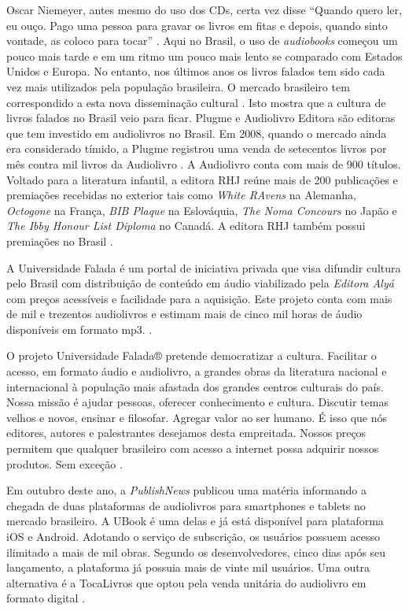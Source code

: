 Oscar Niemeyer, antes mesmo do uso dos CDs, certa vez disse ``Quando quero ler, eu ouço. Pago uma pessoa para gravar os livros em fitas e depois, quando sinto vontade, as coloco para tocar'' \cite{audiobookinovacao}. Aqui no Brasil, o uso de \textit{audiobooks} começou um pouco mais tarde e em um ritmo um pouco mais lento se comparado com Estados Unidos e Europa. No entanto, nos últimos anos os livros falados tem sido cada vez mais utilizados pela população brasileira. O mercado brasileiro tem correspondido a esta nova disseminação cultural \cite{farias}. Isto mostra que a cultura de livros falados no Brasil veio para ficar. Plugme e Audiolivro Editora são editoras que tem investido em audiolivros no Brasil. Em 2008, quando o mercado ainda era considerado tímido, a Plugme registrou uma venda de setecentos livros por mês contra mil livros da Audiolivro \cite{audiobooksuporte}. A Audiolivro conta com mais de 900 títulos. Voltado para a literatura infantil, a editora RHJ reúne mais de 200 publicações e premiações recebidas no exterior tais como \textit{White RAvens} na Alemanha, \textit{Octogone} na França, \textit{BIB Plaque} na Eslováquia, \textit{The Noma Concours} no Japão e \textit{The Ibby Honour List Diploma} no Canadá. A editora RHJ também possui premiações no Brasil \cite{rhj}.

A Universidade Falada é um portal de iniciativa privada que visa difundir cultura pelo Brasil com distribuição de conteúdo em áudio viabilizado pela \textit{Editora Alyá} com preços acessíveis e facilidade para a aquisição. Este projeto conta com mais de mil e trezentos audiolivros e estimam mais de cinco mil horas de áudio disponíveis em formato mp3. \cite{universidadefalada}.

\begin{citacao}
O projeto Universidade Falada® pretende democratizar a cultura. Facilitar o acesso, em formato áudio e audiolivro, a grandes obras da literatura nacional e internacional à população mais afastada dos grandes centros culturais do país. Nossa missão é ajudar pessoas, oferecer conhecimento e cultura. Discutir temas velhos e novos, ensinar e filosofar. Agregar valor ao ser humano. É isso que nós editores, autores e palestrantes desejamos desta empreitada. Nossos preços permitem que qualquer brasileiro com acesso a internet possa adquirir nossos produtos. Sem exceção \cite{universidadefalada}.
\end{citacao}

Em outubro deste ano, a \textit{PublishNews} publicou uma matéria informando a chegada de duas plataformas de audiolivros para smartphones e tablets no mercado brasileiro. A UBook é uma delas e já está disponível para plataforma iOS e Android. Adotando o serviço de subscrição, os usuários possuem acesso ilimitado a mais de mil obras. Segundo os desenvolvedores, cinco dias após seu lançamento, a plataforma já possuia mais de vinte mil usuários. Uma outra alternativa é a TocaLivros que optou pela venda unitária do audiolivro em formato digital \cite{publishnews}. %

